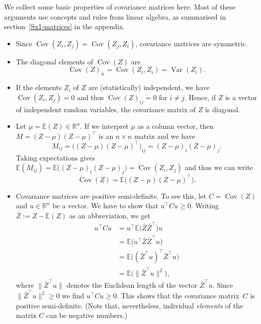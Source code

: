 \documentclass[
  a4paper,
]{article}
\theoremstyle{definition}
\theoremstyle{definition}
\theoremstyle{definition}
\theoremstyle{definition}
\theoremstyle{remark}
\begin{document}
We collect some basic properties of covariance matrices here. Most of these
arguments use concepts and rules from linear algebra, as summarised in
section~\ref{Sx1-matrices} in the appendix.

\begin{itemize}
\item
  Since \(\mathop{\mathrm{Cov}}(Z_i, Z_j) = \mathop{\mathrm{Cov}}(Z_j, Z_i)\), covariance matrices are
  symmetric.
\item
  The diagonal elements of \(\mathop{\mathrm{Cov}}(Z)\) are
  \begin{equation}
    \mathop{\mathrm{Cov}}(Z)_{ii}
    = \mathop{\mathrm{Cov}}(Z_i, Z_i)
    = \mathop{\mathrm{Var}}(Z_i).  \label{eq:Cov-diag-elem}
  \end{equation}
\item
  If the elements \(Z_i\) of \(Z\) are (statistically) independent,
  we have \(\mathop{\mathrm{Cov}}(Z_i, Z_j) = 0\) and thus \(\mathop{\mathrm{Cov}}(Z)_{ij} = 0\)
  for \(i \neq j\). Hence, if \(Z\) is a vector of independent random variables,
  the covariance matrix of \(Z\) is diagonal.
\item
  Let \(\mu = \mathbb{E}(Z) \in \mathbb{R}^n\). If we interpret \(\mu\) as a column vector,
  then \(M = (Z - \mu) (Z - \mu)^\top\) is an \(n\times n\) matrix and we have
  \begin{equation*}
    M_{ij}
    = \bigl( (Z - \mu) (Z - \mu)^\top \bigr)_{ij}
    = (Z - \mu)_i (Z - \mu)_j.
  \end{equation*}
  Taking expectations gives \(\mathbb{E}(M_{ij}) = \mathbb{E}\bigl( (Z - \mu)_i (Z - \mu)_j
  \bigr) = \mathop{\mathrm{Cov}}(Z_i, Z_j)\) and thus we can write
  \begin{equation}
    \mathop{\mathrm{Cov}}(Z)
    = \mathbb{E}\bigl( (Z - \mu) (Z - \mu)^\top \bigr).  \label{eq:cov-prod}
  \end{equation}
\item
  Covariance matrices are positive semi-definite. To see this, let
  \(C = \mathop{\mathrm{Cov}}(Z)\) and \(u \in\mathbb{R}^n\) be a vector. We have to show that
  \(u^\top C u \geq 0\). Writing \(\bar Z := Z - \mathbb{E}(Z)\) as an abbreviation,
  we get
  \begin{align*}
    u^\top C u
    &= u^\top \mathbb{E}\bigl( \bar Z \bar Z^\top \bigr) u \\
    &= \mathbb{E}\bigl( u^\top \bar Z \bar Z^\top u \bigr) \\
    &= \mathbb{E}\bigl( (\bar Z^\top u)^\top \bar Z^\top u \bigr) \\
    &= \mathbb{E}\bigl( \|\bar Z^\top u\|^2 \bigr),
  \end{align*}
  where \(\|\bar Z^\top u\|\) denotes the Euclidean length of the
  vector \(\bar Z^\top u\). Since \(\|\bar Z^\top u\|^2 \geq 0\)
  we find \(u^\top C u \geq 0\). This shows that the covariance matrix~\(C\)
  is positive semi-definite. (Note that, nevertheless,
  individual \emph{elements} of the matrix \(C\) can be negative numbers.)
\end{itemize}
\end{document}
